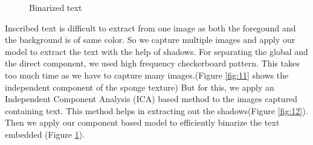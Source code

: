 \begin{figure}[t]
\centering
{}
\label{fig:subfig11}
\caption
{Binarized text}
\label{fig:13}
\end{figure}
Inscribed text is difficult to extract from one image as both the foregound and the background is of same 
color.
So we capture multiple images and apply our model to extract the text with the help of shadows.
For separating the global and the direct component, we used high frequency checkerboard pattern. 
This takes too much time as we have to capture many images.(Figure \ref{fig:11} shows
the independent component of the sponge texture)
But for this, we apply an Independent Component Analysis (ICA) based method to the images captured containing text.
This method helps in extracting out the shadows(Figure \ref{fig:12}). 
Then we apply our component based model to efficiently binarize the text
embedded (Figure \ref{fig:13}).


